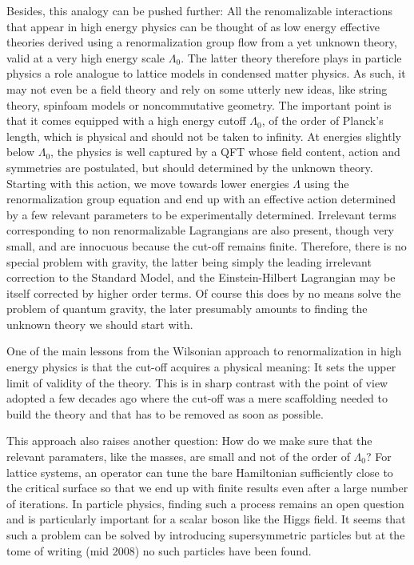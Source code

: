 \documentclass[10pt,here,feynmf]{article}
\begin{document}
Besides, this analogy can be pushed further: All the renomalizable interactions that appear in high energy physics can be thought of as low energy effective theories derived using  a renormalization group flow from a yet unknown theory, valid at a very high energy scale $\Lambda_{0}$. The latter theory therefore plays in particle physics a role analogue to lattice models in condensed matter physics. As such, it may not even be a field theory and rely on some utterly new ideas, like string theory, spinfoam models or noncommutative geometry. The important point is that it comes equipped with a high energy cutoff $\Lambda_{0}$, of the order of Planck's length, which is physical and should not be taken to infinity. At energies slightly  below $\Lambda_{0}$, the physics is well captured by a QFT whose field content, action and symmetries are postulated, but should determined by the unknown theory. Starting with this action, we move towards  lower energies $\Lambda$ using the renormalization group equation and end up with an effective action determined by a few relevant parameters to be experimentally determined. Irrelevant terms corresponding to non renormalizable Lagrangians are also present, though very small, and are innocuous because the cut-off remains finite. Therefore, there is no special problem with gravity, the latter being simply the leading irrelevant correction to the Standard Model, and the Einstein-Hilbert Lagrangian  may be itself corrected by higher order terms. Of course this does by no means solve the problem of quantum gravity, the later presumably amounts to finding the unknown theory we should start with. 

One of the main lessons from the Wilsonian approach to renormalization in high energy physics is that the cut-off acquires a physical meaning: It sets the upper limit of validity of the theory. This is in sharp contrast with the point of view adopted a few decades ago where the cut-off was a mere scaffolding needed to build the theory and that has to be removed as soon as possible. 


This approach also raises another question: How do we make sure that the relevant paramaters, like the masses, are small and not of the order of $\Lambda_{0}$? For lattice systems, an operator can tune the bare Hamiltonian sufficiently close to the critical surface so that we end up with finite results even after a large number of iterations. In particle physics, finding such a process remains an open question and is  particularly important for a scalar boson like the Higgs field. It seems that such a problem can be solved by introducing supersymmetric particles but at the tome of writing (mid 2008) no such particles have been found. 
\end{document}
